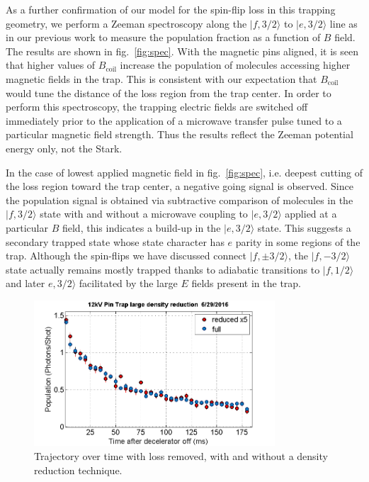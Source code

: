 \documentclass[%
 reprint,
 amsmath,amssymb,
 aps,
prl,
]{revtex4-1}
\begin{document}
As a further confirmation of our model for the spin-flip loss in this trapping geometry, we perform a Zeeman spectroscopy along the $|f,3/2\rangle$ to $|e,3/2\rangle$ line as in our previous work \cite{stuhl2012evap} to measure the population fraction as a function of $B$ field. The results are shown in fig.~\ref{fig:spec}. With the magnetic pins aligned, it is seen that higher values of $B_{\text{coil}}$ increase the population of molecules accessing higher magnetic fields in the trap. This is consistent with our expectation that $B_\text{coil}$ would tune the distance of the loss region from the trap center. In order to perform this spectroscopy, the trapping electric fields are switched off immediately prior to the application of a microwave transfer pulse tuned to a particular magnetic field strength. Thus the results reflect the Zeeman potential energy only, not the Stark. 

In the case of lowest applied magnetic field in fig.~\ref{fig:spec}, i.e. deepest cutting of the loss region toward the trap center, a negative going signal is observed. Since the population signal is obtained via subtractive comparison of molecules in the $|f,3/2\rangle$ state with and without a microwave coupling to $|e,3/2\rangle$ applied at a particular $B$ field, this indicates a build-up in the $|e,3/2\rangle$ state. This suggests a secondary trapped state whose state character has $e$ parity in some regions of the trap. Although the spin-flips we have discussed connect $|f,\pm3/2\rangle$, the $|f,-3/2\rangle$ state actually remains mostly trapped thanks to adiabatic transitions to $|f,1/2\rangle$ and later $e,3/2\rangle$ facilitated by the large $E$ fields present in the trap. 

\begin{figure}
\includegraphics[width=90mm]{reduce-density-compare.png}%
\caption{
Trajectory over time with loss removed, with and without a density reduction technique.
\label{fig:timetrace}}
\end{figure}
\end{document}
